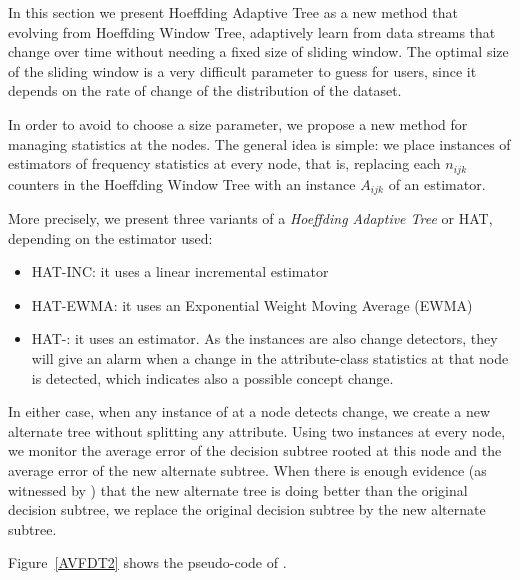 \label{HATree}

In this section we present Hoeffding Adaptive Tree as a new method 
that evolving from Hoeffding Window Tree, adaptively learn from data streams that change over time
without needing a fixed size of sliding window. The optimal size of the
sliding window is a very difficult parameter to guess for users, since it depends
on the rate of change of the distribution of the dataset.

In order to avoid to choose a size parameter, we propose a new method for managing
 statistics at the nodes. The general idea is simple: 
we place instances of estimators of frequency
statistics at every node, that is, replacing each $n_{ijk}$ counters in the Hoeffding Window Tree
with an instance $A_{ijk}$ of an estimator. 

More precisely, we present three variants of a {\em Hoeffding Adaptive Tree} or HAT, depending on
the estimator used:

\begin{itemize}
 \item HAT-INC: it uses a linear incremental estimator
 \item HAT-EWMA: it uses an Exponential Weight Moving Average (EWMA)
 \item HAT-\adwin: it uses an \adwin estimator. As the \adwin instances
are also change detectors, they will give an alarm 
when a change in the attribute-class statistics at that node 
is detected, which indicates also a possible concept change. 
\end{itemize}


\BEGINOMIT
In either case, when any instance of \adwin at a node detects change, we create
a new alternate tree without splitting any attribute. 
Using two \adwin instances at every node, we monitor the average error of the decision 
subtree rooted at this node and the average error of the new alternate subtree. 
When there is enough evidence (as witnessed by \adwinb) that the new alternate tree 
is doing better than the original decision subtree, 
we replace the original decision subtree by the new alternate subtree. 

Figure~\ref{AVFDT2} shows the pseudo-code of \adwindtb.
\ENDOMIT

